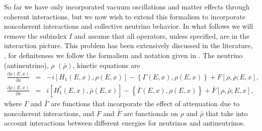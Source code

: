 \documentclass[3p,12pt]{elsarticle}
\newcommand{\pa}[2]{\frac{\partial #1}{\partial #2}}
\begin{document}
So far we have only incorporated vacuum oscillations and matter
effects through coherent interactions, but we now wish to extend this
formalism to incorporate noncoherent interactions and collective
neutrino behavior. In what follows we will remove the subindex $I$ and
assume that all operators, unless specified, are in the interaction picture. 
This problem has been extensively discussed in the literature,
\citep{Sigl:1992fn,Duan:2010tk,Strack:qd,Zhang:2013ay,
 Cirelli:mw,Blennow:2007tw,Arguelles:2012cf}, for definiteness we
follow the formalism and notation given in
\citep{Gonzalez-Garcia:2005xw}.
The neutrino (antineutrino), $\rho$ $(\bar\rho)$, kinetic equations are
\begin{subequations}
\begin{eqnarray}
\pa{\rho(E,x)}{x} &=& -i [ H_1 (E,x), \rho(E,x) ] - \left\{ \Gamma(E,x),
  \rho(E,x) \right\} + F\left[\rho,\bar\rho;E,x\right] ,\\
%
\pa{\bar\rho(E,x)}{x} &=& i [ H^*_1 (E,x), \bar\rho(E,x) ] - \left\{ \bar\Gamma(E,x),
  \rho(E,x) \right\} + \bar F\left[\rho,\bar\rho;E,x\right] ,
\end{eqnarray}
\end{subequations}
where $\Gamma$ and $\bar\Gamma$  are functions that incorporate the effect of attenuation due to
noncoherent interactions, and $F$ and $\bar F$  are  functionals on
$\rho$ and $\bar\rho$ that take into account interactions between
different energies for neutrinos and antineutrinos.
\end{document}
